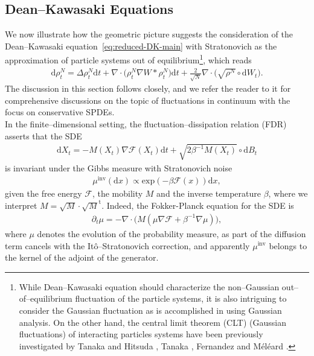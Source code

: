 \subsection{Dean--Kawasaki Equations}\label{sec:DK-derivation}
We now illustrate how the geometric picture suggests the consideration of the Dean--Kawasaki equation~\eqref{eq:reduced-DK-main} with Stratonovich as the approximation of particle systems out of equilibrium\footnote{While Dean--Kawasaki equation should characterize the non--Gaussian out--of--equilibrium fluctuation of the particle systems, it is also intriguing to consider the Gaussian fluctuation as is accomplished in \cite{WZZ21} using Gaussian analysis. On the other hand, the central limit theorem (CLT) (Gaussian fluctuations) of interacting particles systems have been previously investigated by Tanaka and Hitsuda \cite{TH81}, Tanaka \cite{T84}, Fernandez and
M\'el\'eard \cite{FM97}.}, which reads
\begin{align*}
    \mathrm{d}\rho^N_t = \Delta \rho^N_t \mathrm{d}t + \nabla \cdot \big(\rho^N_t  \nabla W \ast \rho^N_t \big)\mathrm{d}t + \frac{2}{\sqrt{N}}\nabla \cdot \big(\sqrt{\rho^N} \circ \mathrm{d}W_t\big).
\end{align*}
The discussion in this section follows \cite{Gess2025Fluctuations} closely, and we refer the reader to it for comprehensive discussions on the topic of fluctuations in continuum with the focus on conservative SPDEs.\\

In the finite--dimensional setting, the fluctuation--dissipation relation (FDR) asserts that the SDE
\begin{align}\label{eq:SDE_FDR}
\mathrm{d}X_t = -M(X_t)\nabla \mathcal{F}(X_t)\mathrm{d}t + \sqrt{2\beta^{-1}M(X_t)} \circ \mathrm{d}B_t
\end{align}
is invariant under the Gibbs measure with Stratonovich noise
\begin{align*}
\mu^{\mathrm{inv}}(\mathrm{d}x) \propto \mathrm{exp}\left(-\beta\mathcal{F}(x)\right) \mathrm{d}x,
\end{align*}
given the free energy $\mathcal{F}$, the mobility $M$ and the inverse temperature $\beta$, where we interpret $M = \sqrt{M} \cdot \sqrt{M}^{\mathrm{t}}$. Indeed, the Fokker-Planck equation for the SDE is 
\begin{align*}
\partial_t\mu =-\nabla \cdot \big(M (\mu\nabla \mathcal{F} + \beta^{-1}\nabla \mu)\big),
\end{align*}
where $\mu$ denotes the evolution of the probability measure, as part of the diffusion term cancels with the It\^o--Stratonovich correction, and apparently $\mu^{\mathrm{inv}}$ belongs to the kernel of the adjoint of the generator.

